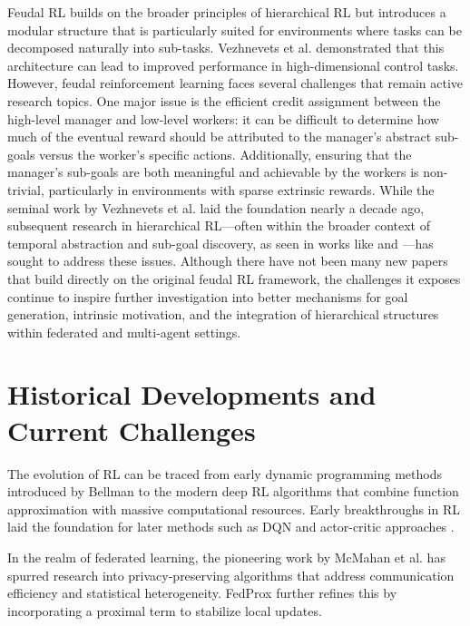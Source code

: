 \documentclass[12pt,a4paper,twoside,openany]{book}
\begin{document}
Feudal RL builds on the broader principles of hierarchical RL but introduces a modular structure that is particularly suited for environments where tasks can be decomposed naturally into sub-tasks. Vezhnevets et al. \cite{Vezhnevets2017} demonstrated that this architecture can lead to improved performance in high-dimensional control tasks. However, feudal reinforcement learning faces several challenges that remain active research topics. One major issue is the efficient credit assignment between the high-level manager and low-level workers: it can be difficult to determine how much of the eventual reward should be attributed to the manager’s abstract sub-goals versus the worker’s specific actions. Additionally, ensuring that the manager’s sub-goals are both meaningful and achievable by the workers is non-trivial, particularly in environments with sparse extrinsic rewards. While the seminal work by Vezhnevets et al. laid the foundation nearly a decade ago, subsequent research in hierarchical RL—often within the broader context of temporal abstraction and sub-goal discovery, as seen in works like \cite{Sutton1999} and \cite{Kulkarni2016}—has sought to address these issues. Although there have not been many new papers that build directly on the original feudal RL framework, the challenges it exposes continue to inspire further investigation into better mechanisms for goal generation, intrinsic motivation, and the integration of hierarchical structures within federated and multi-agent settings.

\section{Historical Developments and Current Challenges}

The evolution of RL can be traced from early dynamic programming methods introduced by Bellman \cite{Bellman1957} to the modern deep RL algorithms that combine function approximation with massive computational resources. Early breakthroughs in RL laid the foundation for later methods such as DQN \cite{Mnih2015} and actor-critic approaches \cite{Sutton2000}.

In the realm of federated learning, the pioneering work by McMahan et al. \cite{McMahan2016} has spurred research into privacy-preserving algorithms that address communication efficiency and statistical heterogeneity. FedProx \cite{Li2020} further refines this by incorporating a proximal term to stabilize local updates.
\end{document}
